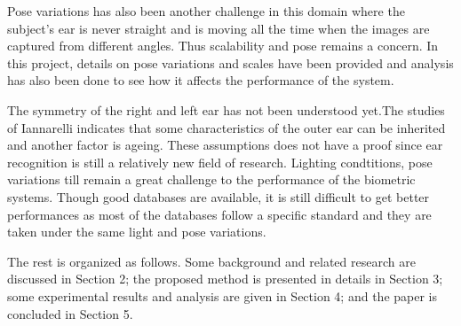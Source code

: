  Pose variations has also been another challenge in this domain where the subject's ear is never straight and is moving all the time when the images are captured from different angles. Thus scalability and pose remains a concern. In this project, details on pose variations and scales have been provided and analysis has also been done to see how it affects the performance of the system.
 
 The symmetry of the right and left ear has not been understood yet.The studies of Iannarelli indicates that some characteristics of the outer ear can be inherited and another factor is ageing. These assumptions does not have a proof since ear recognition is still a relatively new field of research. Lighting condtitions, pose variations till remain a great challenge to the performance of the biometric systems. Though good databases are available, it is still difficult to get better performances as most of the databases follow a specific standard and they are taken under the same light and pose variations.
 
 

The rest  is organized as follows. Some background and related research are discussed in Section 2; the proposed method is presented in details in Section 3; some experimental results and analysis are given in Section 4; and the paper is concluded in Section 5.
